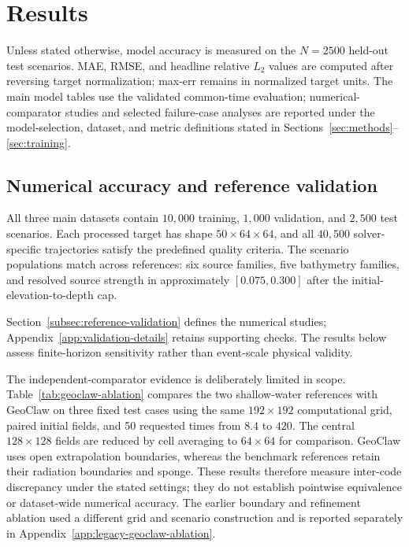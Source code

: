 \section{Results}
\label{sec:results}

Unless stated otherwise, model accuracy is measured on the $N = 2500$ held-out test scenarios. MAE, RMSE, and headline relative $L_2$ values are computed after reversing target normalization; max-err remains in normalized target units. The main model tables use the validated common-time evaluation; numerical-comparator studies and selected failure-case analyses are reported under the model-selection, dataset, and metric definitions stated in Sections~\ref{sec:methods}--\ref{sec:training}.

\subsection{Numerical accuracy and reference validation}
\label{subsec:res-dataset}

All three main datasets contain $10{,}000$ training, $1{,}000$ validation, and $2{,}500$ test scenarios. Each processed target has shape $50 \times 64 \times 64$, and all $40{,}500$ solver-specific trajectories satisfy the predefined quality criteria. The scenario populations match across references: six source families, five bathymetry families, and resolved source strength in approximately $[0.075, 0.300]$ after the initial-elevation-to-depth cap.

Section~\ref{subsec:reference-validation} defines the numerical studies; Appendix~\ref{app:validation-details} retains supporting checks. The results below assess finite-horizon sensitivity rather than event-scale physical validity.

The independent-comparator evidence is deliberately limited in scope. Table~\ref{tab:geoclaw-ablation} compares the two shallow-water references with GeoClaw on three fixed test cases using the same $192 \times 192$ computational grid, paired initial fields, and 50 requested times from $8.4$ to $420$. The central $128 \times 128$ fields are reduced by cell averaging to $64 \times 64$ for comparison. GeoClaw uses open extrapolation boundaries, whereas the benchmark references retain their radiation boundaries and sponge. These results therefore measure inter-code discrepancy under the stated settings; they do not establish pointwise equivalence or dataset-wide numerical accuracy. The earlier boundary and refinement ablation used a different grid and scenario construction and is reported separately in Appendix~\ref{app:legacy-geoclaw-ablation}.

